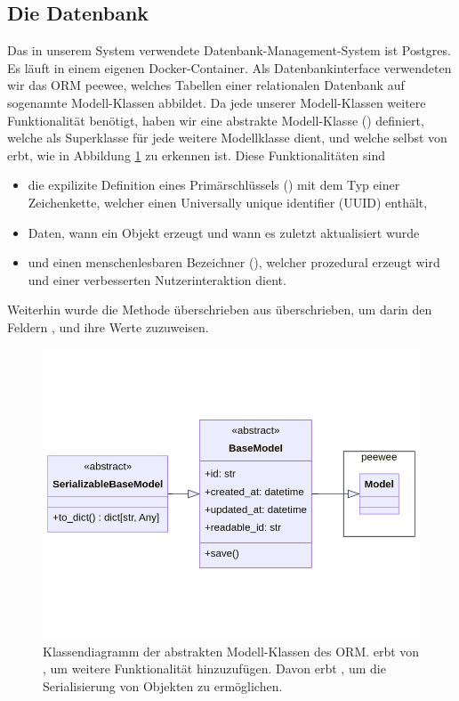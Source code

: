 \subsection{Die Datenbank}

Das in unserem System verwendete Datenbank-Management-System ist Postgres. Es läuft in einem eigenen Docker-Container. Als Datenbankinterface verwendeten wir das ORM peewee, welches Tabellen einer relationalen Datenbank auf sogenannte Modell-Klassen abbildet. Da jede unserer Modell-Klassen weitere Funktionalität benötigt, haben wir eine abstrakte Modell-Klasse () definiert, welche als Superklasse für jede weitere Modellklasse dient, und welche selbst von  erbt, wie in Abbildung \ref{fig:database-class} zu erkennen ist. Diese Funktionalitäten sind
\begin{itemize}
	\item die expilizite Definition eines Primärschlüssels () mit dem Typ einer Zeichenkette, welcher einen Universally unique identifier (UUID) enthält,
	\item Daten, wann ein Objekt erzeugt und wann es zuletzt aktualisiert wurde
	\item und einen menschenlesbaren Bezeichner (), welcher prozedural erzeugt wird und einer verbesserten Nutzerinteraktion dient.
\end{itemize}
Weiterhin wurde die Methode  überschrieben aus  überschrieben, um darin den Feldern ,  und  ihre Werte zuzuweisen.

\begin{figure}[!hb]
	\centering
	\includegraphics[width=0.75\linewidth]{images/diagrams/database-class.png}
	\caption{Klassendiagramm der abstrakten Modell-Klassen des ORM.  erbt von , um weitere Funktionalität hinzuzufügen. Davon erbt , um die Serialisierung von Objekten zu ermöglichen.}
	\label{fig:database-class}
\end{figure}

